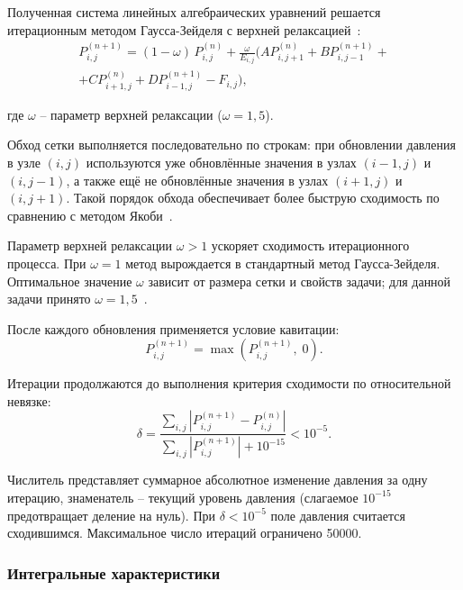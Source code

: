 Полученная система линейных алгебраических уравнений решается итерационным методом Гаусса-Зейделя с верхней релаксацией~\cite{hamrock}:
\begin{equation}
    \begin{split}
    P_{i,j}^{(n+1)} = (1-\omega)\,P_{i,j}^{(n)} + \frac{\omega}{E_{i,j}} \bigl(A P_{i,j+1}^{(n)} + B P_{i,j-1}^{(n+1)} + {} \\
    + C P_{i+1,j}^{(n)} + D P_{i-1,j}^{(n+1)} - F_{i,j}\bigr),
    \end{split}
    \label{eq:sor}
\end{equation}

\noindent где $\omega$ -- параметр верхней релаксации ($\omega = 1{,}5$).

Обход сетки выполняется последовательно по строкам: при обновлении давления в узле $(i, j)$ используются уже обновлённые значения в узлах $(i-1, j)$ и $(i, j-1)$, а также ещё не обновлённые значения в узлах $(i+1, j)$ и $(i, j+1)$. Такой порядок обхода обеспечивает более быструю сходимость по сравнению с методом Якоби~\cite{hamrock}.

Параметр верхней релаксации $\omega > 1$ ускоряет сходимость итерационного процесса. При $\omega = 1$ метод вырождается в стандартный метод Гаусса-Зейделя. Оптимальное значение $\omega$ зависит от размера сетки и свойств задачи; для данной задачи принято $\omega = 1{,}5$~\cite{pinkus}.

После каждого обновления применяется условие кавитации:
\begin{equation}
    P_{i,j}^{(n+1)} = \max(P_{i,j}^{(n+1)},\; 0).
\end{equation}

Итерации продолжаются до выполнения критерия сходимости по относительной невязке:
\begin{equation}
    \delta = \frac{\displaystyle\sum_{i,j} |P_{i,j}^{(n+1)} - P_{i,j}^{(n)}|}{\displaystyle\sum_{i,j} |P_{i,j}^{(n+1)}| + 10^{-15}} < 10^{-5}.
\end{equation}

Числитель представляет суммарное абсолютное изменение давления за одну итерацию, знаменатель -- текущий уровень давления (слагаемое $10^{-15}$ предотвращает деление на нуль). При $\delta < 10^{-5}$ поле давления считается сходившимся. Максимальное число итераций ограничено 50000.

\subsubsection{Интегральные характеристики}

